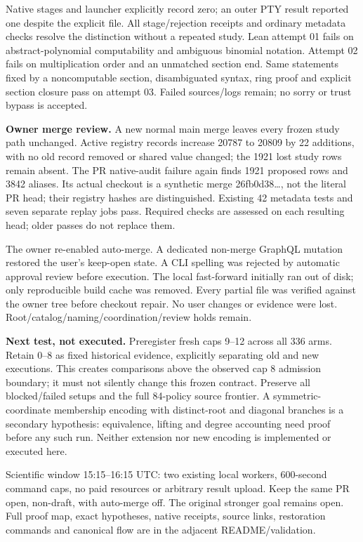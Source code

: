 \documentclass[11pt]{article}
\begin{document}
Native stages and launcher explicitly record zero; an outer PTY result reported
one despite the explicit file. All stage/rejection receipts and ordinary
metadata checks resolve the distinction without a repeated study. Lean attempt 01
fails on abstract-polynomial computability and ambiguous binomial notation.
Attempt 02 fails on multiplication order and an unmatched section end. Same
statements fixed by a noncomputable section, disambiguated syntax, ring proof
and explicit section closure pass on attempt 03. Failed sources/logs remain;
no sorry or trust bypass is accepted.

\textbf{Owner merge review.} A new normal main merge leaves every frozen study
path unchanged. Active registry records increase 20787 to 20809 by 22 additions,
with no old record removed or shared value changed; the 1921 lost study rows
remain absent. The PR native-audit failure again finds 1921 proposed rows and 3842
aliases. Its actual checkout is a synthetic merge 26fb0d38\ldots, not the literal
PR head; their registry hashes are distinguished. Existing 42 metadata tests and
seven separate replay jobs pass. Required checks are assessed on each resulting
head; older passes do not replace them.

The owner re-enabled auto-merge. A dedicated non-merge GraphQL mutation restored
the user's keep-open state. A CLI spelling was rejected by automatic approval
review before execution. The local fast-forward initially ran out of disk;
only reproducible build cache was removed. Every partial file was verified
against the owner tree before checkout repair. No user changes or evidence
were lost. Root/catalog/naming/coordination/review holds remain.

\textbf{Next test, not executed.} Preregister fresh caps 9--12 across all 336
arms. Retain 0--8 as fixed historical evidence, explicitly separating old and new
executions. This creates comparisons above the observed cap 8 admission boundary;
it must not silently change this frozen contract. Preserve all blocked/failed
setups and the full 84-policy source frontier. A symmetric-coordinate membership
encoding with distinct-root and diagonal branches is a secondary hypothesis:
equivalence, lifting and degree accounting need proof before any such run.
Neither extension nor new encoding is implemented or executed here.

Scientific window 15:15--16:15 UTC: two existing local workers, 600-second command
caps, no paid resources or arbitrary result upload. Keep the same PR open,
non-draft, with auto-merge off. The original stronger goal remains open.
\small Full proof map, exact hypotheses, native receipts, source links,
restoration commands and canonical flow are in the adjacent README/validation.
\end{document}
